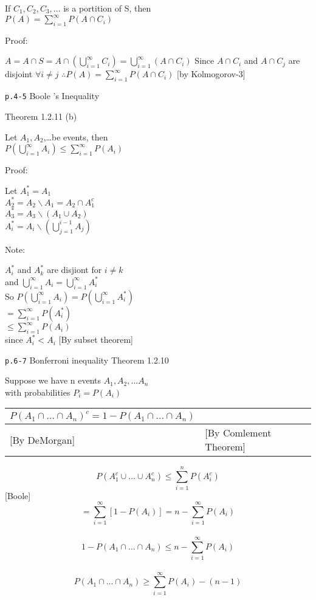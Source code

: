 \documentclass[]{tufte-book}
\begin{document}
If \(C_{1},C_{2},C_{3},...\) is a portition of S, then\\
\(P(A)=\sum_{i=1}^\infty P(A\cap C_{i})\)

Proof:

\(A=A\cap S=A\cap(\bigcup_{i=1}^\infty C_{i})=\bigcup_{i=1}^\infty(A\cap C_{i})\)
Since \(A\cap C_i\) and \(A\cap C_j\) are disjoint \(\forall i\ne j\)
\(\therefore P(A)= \sum_{i=1}^\infty P(A\cap C_{i})\) {[}by
Kolmogorov-3{]}

\texttt{p.4-5} Boole 's Inequality

Theorem 1.2.11 (b)

Let \(A_{1}, A_{2}\),\ldots{}be events, then\\
\(P(\bigcup_{i=1}^\infty A_i)\le\sum_{i=1}^\infty P(A_{i})\)

Proof:

Let \(A_{1}^*=A_1\)\\
\(A_2^*=A_2\backslash A_1=A_2\cap A_1^c\)\\
\(A_3^*=A_3\backslash (A_1\cup A_2)\)\\
\(A_i^*=A_i\backslash (\bigcup_{j=1}^{i-1} A_j)\)

Note:

\(A_i^*\) and \(A_k^*\) are disjiont for \(i\ne k\)\\
and \(\bigcup_{i=1}^\infty A_i=\bigcup_{i=1}^\infty A_i^*\)\\
So \(P(\bigcup_{i=1}^\infty A_i)=P(\bigcup_{i=1}^\infty A_i^*)\)\\
\(=\sum_{i=1}^\infty P(A_i^*)\)\\
\(\le\sum_{i=1}^\infty P(A_i)\)\\
since \(A_i^*<A_i\) {[}By subset theorem{]}

\texttt{p.6-7} Bonferroni inequality Theorem 1.2.10

Suppose we have n events \(A_1, A_2,...A_n\)\\
with probabilities \(P_i=P(A_i)\)

\begin{longtable}[]{@{}ll@{}}
\toprule
\(P(A_1\cap ...\cap A_n)^c=1-P(A_1\cap ...\cap A_n)\) &\tabularnewline
\midrule
\endhead
{[}By DeMorgan{]} & {[}By Comlement Theorem{]}\tabularnewline
\bottomrule
\end{longtable}

\[P(A_1^c\cup ...\cup A_n^c)\le\sum_{i=1}^n P(A_i^c)\] {[}Boole{]}\\
\[=\sum_{i=1}^\infty[1-P(A_i)]=n-\sum_{i=1}^\infty P(A_i)\]\\
\[1-P(A_1\cap ...\cap A_n)\le n-\sum_{i=1}^\infty P(A_i)\]\\
\[P(A_1\cap ...\cap A_n)\ge\sum_{i=1}^\infty P(A_i)-(n-1)\]
\end{document}

